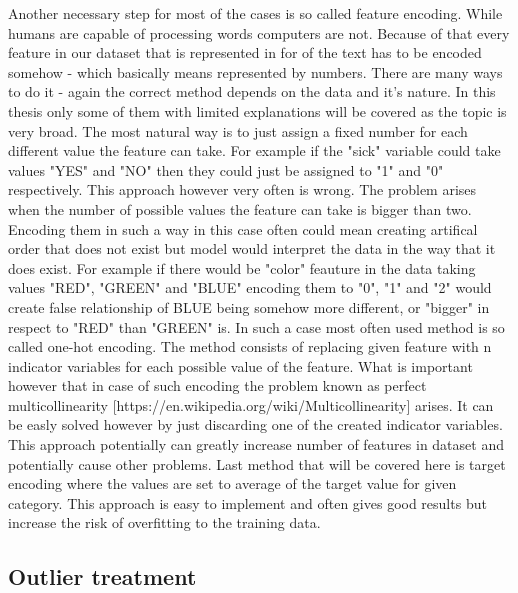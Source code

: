 \documentclass[a4paper,twoside,12pt]{book}
\begin{document}
Another necessary step for most of the cases is so called feature encoding. While humans are capable of processing words computers are not. Because of that every feature in our dataset that is represented in for of the text has to be encoded somehow - which basically means represented by numbers.
There are many ways to do it - again the correct method depends on the data and it's nature. 
In this thesis only some of them with limited explanations will be covered as the topic is very broad.
The most natural way is to just assign a fixed number for each different value the feature can take. For example if the "sick" variable could take values "YES" and "NO" then they could just be assigned to "1" and "0" respectively. This approach however very often is wrong. The problem arises when the number of possible values the feature can take is bigger than two. Encoding them in such a way in this case often could mean creating artifical order that does not exist but model would interpret the data in the way that it does exist. For example if there would be "color" feauture in the data taking values "RED", "GREEN" and "BLUE" encoding them to "0", "1" and "2" would create false relationship of BLUE being somehow more different, or "bigger" in respect to "RED" than "GREEN" is.
In such a case most often used method is so called one-hot encoding. 
The method consists of replacing given feature with n indicator variables for each possible value of the feature. What is important however that in case of such encoding the problem known as perfect multicollinearity [https://en.wikipedia.org/wiki/Multicollinearity] arises. It can be easly solved however by just discarding one of the created indicator variables. This approach potentially can greatly increase number of features in dataset and potentially cause other problems.
Last method that will be covered here is target encoding where the values are set to average of the target value for given category. This approach is easy to implement and often gives good results but increase the risk of overfitting to the training data.

\subsection{Outlier treatment}
\end{document}

